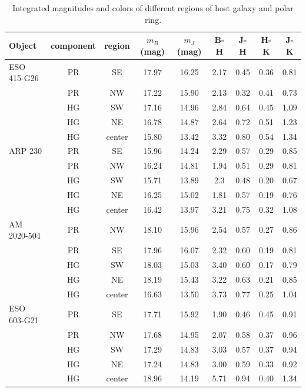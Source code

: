 \documentclass{aa}
\begin{document}
\begin{table}[h]
\centering
\caption[]{Integrated magnitudes and colors of different regions of host 
galaxy and polar ring.}
\label{polycol}
\begin{tabular}{lcccccccc}
\hline
Object&component&region&$m_B$ (mag)&$m_J$ (mag)&B-H&J-H& H-K&J-K\\
\hline\hline
ESO 415-G26 & PR & SE & 17.97 & 16.25& 2.17 &0.45 & 0.36& 0.81\\
            & PR & NW & 17.22 & 15.90& 2.13 &0.32 & 0.41& 0.73\\
            & HG & SW & 17.16 & 14.96& 2.84 &0.64 & 0.45& 1.09\\
            & HG & NE & 16.78 & 14.87& 2.64 &0.72 & 0.51& 1.23\\
            & HG & center & 15.80 & 13.42& 3.32 &0.80 & 0.54& 1.34\\
ARP 230     & PR & SE & 15.96& 14.24& 2.29 &0.57 & 0.29 & 0.85\\
            & PR & NW & 16.24& 14.81& 1.94 &0.51 & 0.29 & 0.81\\
            & HG & SW & 15.71& 13.89& 2.3  &0.48 & 0.20 & 0.67\\
            & HG & NE & 16.25& 15.02& 1.81 &0.57 & 0.19 & 0.76\\
            & HG & center & 16.42& 13.97& 3.21& 0.75 & 0.32& 1.08\\
AM 2020-504 & PR & NW & 18.10& 15.96& 2.54 & 0.57 & 0.27& 0.86\\
            & PR & SE & 17.96& 16.07& 2.32 & 0.60 & 0.19& 0.81\\
            & HG & SW & 18.03& 15.03& 3.40 & 0.60 & 0.17& 0.79\\
            & HG & NE & 18.19& 15.43& 3.22 & 0.63 & 0.21& 0.85\\
            & HG & center & 16.63& 13.50& 3.73 & 0.77 & 0.25& 1.04\\
ESO 603-G21 & PR & SE & 17.71& 15.92& 1.90 & 0.46 & 0.45& 0.91\\
            & PR & NW & 17.68& 14.95& 2.07 & 0.58 & 0.37& 0.96\\
            & HG & SW & 17.29& 14.83& 3.03 & 0.57 & 0.37& 0.94\\
            & HG & NE & 17.24& 14.83& 3.00 & 0.59 & 0.33& 0.92\\
            & HG & center & 18.96& 14.19& 5.71 & 0.94 & 0.40& 1.34\\
\hline
\end{tabular}
\end{table}
\end{document}
